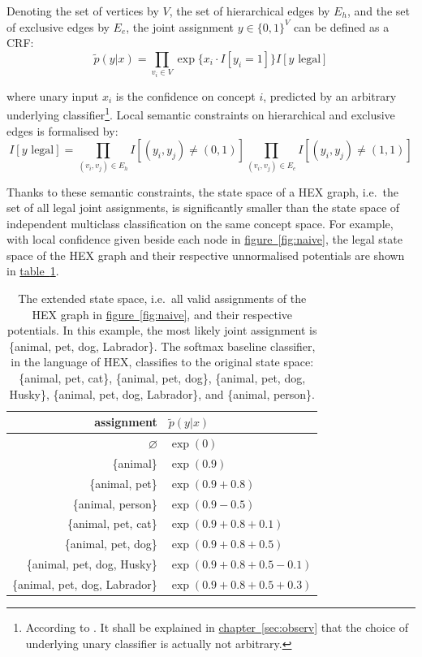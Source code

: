 \documentclass[11pt,a4paper]{book}
\begin{document}
Denoting the set of vertices by $V$, the set of hierarchical edges by $E_h$, and the set of exclusive edges by $E_e$, the joint assignment $y\in\{0,1\}^V$ can be defined as a CRF:
\begin{equation}
\tilde{p}(y|x)=\prod_{v_i\in V}\exp\{x_i\cdot I[y_i=1]\}I[y\text{ legal}]
\label{eqn:naive}
\end{equation}

where unary input $x_i$ is the confidence on concept $i$, predicted by an arbitrary underlying classifier\footnote{According to \cite{deng2014large}. It shall be explained in \hyperref[sec:observ]{chapter~\ref{sec:observ}} that the choice of underlying unary classifier is actually not arbitrary.}. Local semantic constraints on hierarchical and exclusive edges is formalised by:
\begin{equation}
I[y\text{ legal}]=\prod_{(v_i,v_j)\in E_h}I[(y_i,y_j)\neq(0,1)]\prod_{(v_i,v_j)\in E_e}I[(y_i,y_j)\neq(1,1)]
\label{eqn:legal}
\end{equation}

Thanks to these semantic constraints, the state space of a HEX graph, i.e.\ the set of all legal joint assignments, is significantly smaller than the state space of independent multiclass classification on the same concept space. For example, with local confidence given beside each node in \hyperref[fig:naive]{figure~\ref{fig:naive}}, the legal state space of the HEX graph and their respective unnormalised potentials are shown in \hyperref[tab:naive]{table~\ref{tab:naive}}.

\begin{table}[htbp]
\centering
\begin{tabular}{r|l}
assignment & $\tilde{p}(y|x)$\\
\hline
$\varnothing$ & $\exp(0)$\\
\{animal\} & $\exp(0.9)$\\
\{animal, pet\} & $\exp(0.9+0.8)$\\
\{animal, person\} & $\exp(0.9-0.5)$\\
\{animal, pet, cat\} & $\exp(0.9+0.8+0.1)$\\
\{animal, pet, dog\} & $\exp(0.9+0.8+0.5)$\\
\{animal, pet, dog, Husky\} & $\exp(0.9+0.8+0.5-0.1)$\\
\{animal, pet, dog, Labrador\} & $\exp(0.9+0.8+0.5+0.3)$
\end{tabular}
\caption{The extended state space, i.e.\ all valid assignments of the HEX graph in \hyperref[fig:naive]{figure~\ref{fig:naive}}, and their respective potentials. In this example, the most likely joint assignment is \{animal, pet, dog, Labrador\}. The softmax baseline classifier, in the language of HEX, classifies to the original state space: \{animal, pet, cat\}, \{animal, pet, dog\}, \{animal, pet, dog, Husky\}, \{animal, pet, dog, Labrador\}, and \{animal, person\}.}
\label{tab:naive}
\end{table}
\end{document}
